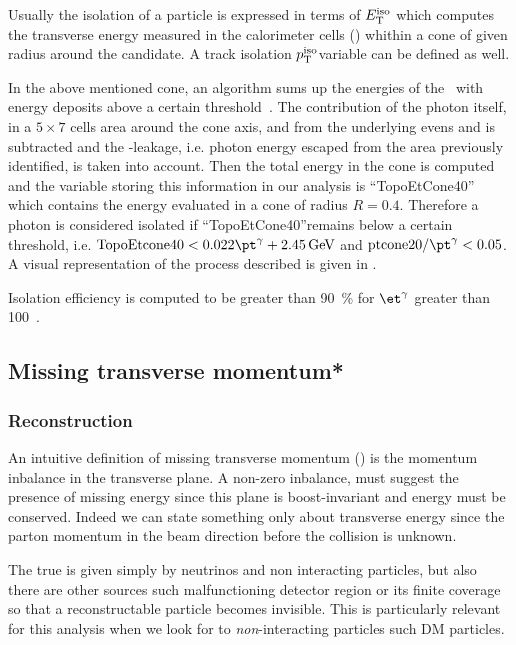 Usually the isolation of a particle is expressed in terms of $E_\textup{T}^{\textup{iso}}$ which computes the transverse energy measured in the calorimeter cells (\topo) whithin a cone of given radius around the candidate. A track isolation $p_\textup{T}^{\textup{iso}}$variable can be defined as well.

In the above mentioned cone, an algorithm sums up the energies of the \topo~with energy deposits above a certain threshold~\cite{photonsISO}. The contribution of the photon itself, in a $5\times7$ cells area around the cone axis, and from the underlying evens and \pileup is  subtracted and the \pt-leakage, i.e. photon energy escaped from the area previously identified, is taken into account. Then the total energy in the cone is computed and the variable storing this information in our analysis is ``TopoEtCone40'' which contains the energy evaluated in a cone of radius $R=0.4$. Therefore a photon is considered isolated if ``TopoEtCone40''remains below a certain threshold, i.e. $\text{TopoEtcone40} < 0.022\pt^\gamma + \SI{2.45}{\GeV}$ and $\text{ptcone20}/\pt^\gamma<0.05$. A visual representation of the process described is given in \Fig{\ref{topoetcone40}}.

Isolation efficiency is computed to be greater than \SI{90}{\percent} for $\et^\gamma$ greater than \SI{100}{\gev}~\cite{photonsISO}.


\subsection{Missing transverse momentum*}
\label{sec:met}
\subsubsection{Reconstruction}

An intuitive definition of missing transverse momentum (\met) is the momentum inbalance in the transverse plane. A non-zero inbalance, must suggest the presence of missing energy since this plane is boost-invariant and energy must be conserved. Indeed we can state something only about transverse energy since the parton momentum in the beam direction before the collision is unknown.

The true \met is given simply by neutrinos and non interacting particles, but also there are other sources such malfunctioning detector region or its finite coverage so that a reconstructable particle becomes invisible. This is particularly relevant for this analysis when we look for to \emph{non}-interacting particles such DM particles.


